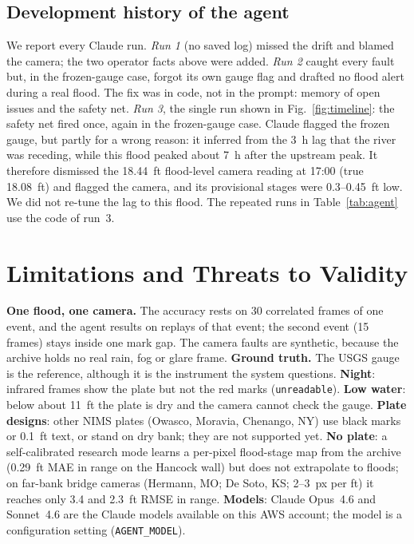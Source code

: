 \documentclass[conference,10pt,letterpaper]{IEEEtran}
\begin{document}
\subsection{Development history of the agent}
\label{sec:history}
We report every Claude run. \emph{Run 1} (no saved log) missed the drift and blamed the camera;
the two operator facts above were added. \emph{Run 2} caught every fault but, in the frozen-gauge
case, forgot its own gauge flag and drafted no flood alert during a real flood. The fix was in
code, not in the prompt: memory of open issues and the safety net. \emph{Run 3}, the single run
shown in Fig.~\ref{fig:timeline}: the safety net fired once, again in the frozen-gauge case.
Claude flagged the frozen gauge, but partly for a wrong reason: it inferred from the 3~h lag
that the river was receding, while this flood peaked about 7~h after the upstream peak. It
therefore dismissed the 18.44~ft flood-level camera reading at 17:00 (true 18.08~ft) and flagged
the camera, and its provisional stages were 0.3--0.45~ft low. We did not re-tune the lag to this flood. The repeated runs in
Table~\ref{tab:agent} use the code of run~3.

\section{Limitations and Threats to Validity}
\textbf{One flood, one camera.} The accuracy rests on 30 correlated frames of one event, and the
agent results on replays of that event; the second event (15 frames) stays inside one mark gap.
The camera faults are synthetic, because the archive holds no real rain, fog or glare frame.
\textbf{Ground truth.}
The USGS gauge is the reference, although it is the instrument the system questions.
\textbf{Night}: infrared frames show the plate but not the red marks (\texttt{unreadable}).
\textbf{Low water}: below about 11~ft the plate is dry and the camera cannot check the gauge.
\textbf{Plate designs}: other NIMS plates (Owasco, Moravia, Chenango, NY) use black marks or
0.1~ft text, or stand on dry bank; they are not supported yet. \textbf{No plate}: a
self-calibrated research mode learns a per-pixel flood-stage map from the archive (0.29~ft MAE in
range on the Hancock wall) but does not extrapolate to floods; on far-bank bridge cameras
(Hermann, MO; De Soto, KS; 2--3~px per ft) it reaches only 3.4 and 2.3~ft RMSE in range.
\textbf{Models}: Claude Opus~4.6 and Sonnet~4.6 are the Claude models available on this AWS
account; the model is a configuration setting (\texttt{AGENT\_MODEL}).
\end{document}
